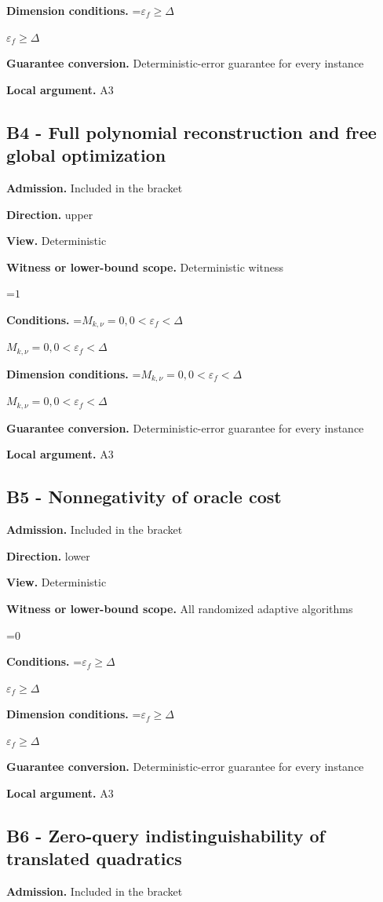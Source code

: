 \documentclass[10pt,a4paper]{article}
\newcommand{\AtlasMath}[1]{\par\begingroup\centering\setbox0=\hbox{$\displaystyle #1$}\ifdim\wd0>1.4\linewidth\typeout{ATLAS WIDE FORMULA: \the\wd0}\fi\ifdim\wd0>\linewidth\resizebox{\linewidth}{!}{\box0}\else\box0\fi\par\endgroup}
\newcommand{\AtlasInlineMath}[1]{\begingroup\setbox0=\hbox{$#1$}\ifdim\wd0>.4\linewidth\endgroup\AtlasMath{#1}\else\endgroup$#1$\fi}
\begin{document}
\textbf{Dimension conditions.} \AtlasInlineMath{\varepsilon_f\ge \Delta}

\textbf{Guarantee conversion.} Deterministic-error guarantee for every instance

\textbf{Local argument.} A3

\subsection{B4 - Full polynomial reconstruction and free global optimization}
\textbf{Admission.} Included in the bracket

\textbf{Direction.} upper

\textbf{View.} Deterministic

\textbf{Witness or lower-bound scope.} Deterministic witness

\AtlasMath{1}
\textbf{Conditions.} \AtlasInlineMath{M_{k,\nu}=0,0<\varepsilon_f<\Delta}

\textbf{Dimension conditions.} \AtlasInlineMath{M_{k,\nu}=0,0<\varepsilon_f<\Delta}

\textbf{Guarantee conversion.} Deterministic-error guarantee for every instance

\textbf{Local argument.} A3

\subsection{B5 - Nonnegativity of oracle cost}
\textbf{Admission.} Included in the bracket

\textbf{Direction.} lower

\textbf{View.} Deterministic

\textbf{Witness or lower-bound scope.} All randomized adaptive algorithms

\AtlasMath{0}
\textbf{Conditions.} \AtlasInlineMath{\varepsilon_f\ge \Delta}

\textbf{Dimension conditions.} \AtlasInlineMath{\varepsilon_f\ge \Delta}

\textbf{Guarantee conversion.} Deterministic-error guarantee for every instance

\textbf{Local argument.} A3

\subsection{B6 - Zero-query indistinguishability of translated quadratics}
\textbf{Admission.} Included in the bracket
\end{document}
